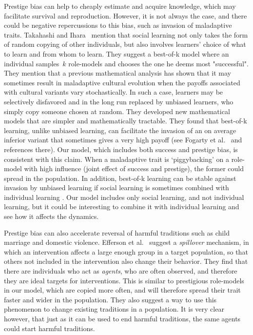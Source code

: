 \documentclass[12pt]{extarticle}
\begin{document}
Prestige bias can help to cheaply estimate and acquire knowledge, which may facilitate survival and reproduction. However, it is not always the case, and there could be negative repercussions to this bias, such as invasion of maladaptive traits.
Takahashi and Ihara~\citep{best_of_k} mention that social learning not only takes the form of random copying of other individuals, but also involves learners' choice of what to learn and from whom to learn. They suggest a best-of-k model where an individual samples~$k$ role-models and chooses the one he deems most "successful". They mention that a previous mathematical analysis has shown that it may sometimes result in maladaptive cultural evolution when the payoffs associated with cultural variants vary stochastically. In such a case, learners may be selectively disfavored and in the long run replaced by unbiased learners, who simply copy someone chosen at random. They developed new mathematical models that are simpler and mathematically tractable. They found that best-of-k learning, unlike unbiased learning, can facilitate the invasion of an on average inferior variant that sometimes gives a very high payoff (see Fogarty et al.\ \citep{Fogarty2017} and references there). Our model, which includes both success and prestige bias, is consistent with this claim. When a maladaptive trait is `piggybacking' on a role-model with high influence (joint effect of success and prestige), the former could spread in the population.
In addition, best-of-k learning can be stable against invasion by unbiased learning if social learning is sometimes combined with individual learning \citep{best_of_k}. 
Our model includes only social learning, and not individual learning, but it could be interesting to combine it with individual learning and see how it affects the dynamics.

Prestige bias can also accelerate reversal of harmful traditions such as child marriage and domestic violence. 
Efferson et al.~\citep{harmful_traditions} suggest a \emph{spillover} mechanism, in which an intervention affects a large enough group in a target population, so that others not included in the intervention also change their behavior.
They find that there are individuals who act as \emph{agents}, who are often observed, and therefore they are ideal targets for interventions. This is similar to prestigious role-models in our model, which are copied more often, and will therefore spread their trait faster and wider in the population.
They also suggest a way to use this phenomenon to change existing traditions in a population.
It is very clear however, that just as it can be used to end harmful traditions, the same agents could start harmful traditions.
\end{document}
